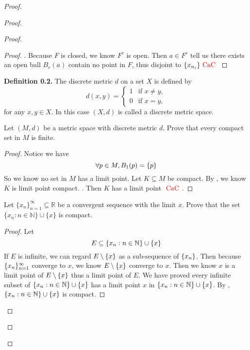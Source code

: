 \documentclass{report}
\begin{document}
\begin{proof}
\begin{proof}
\begin{proof}
\begin{proof}
. Because $F$ is closed, we know  $F^c$ is open. Then  $a\in F^c$ tell us there exists an open ball $B_r(a)$ contain no point in $F$, thus disjoint to  $\{ x_{n_i} \}\text{ \textcolor{red}{CaC} }$

\end{proof}
\textbf{Definition 0.2.} The discrete metric \( d \) on a set \( X \) is defined by
\[
d(x,y) = 
\begin{cases} 
1 & \text{if } x \neq y, \\
0 & \text{if } x = y,
\end{cases}
\]
for any \( x, y \in X \). In this case \( (X,d) \) is called a discrete metric space.
\begin{question}{}{}

Let \( (M, d) \) be a metric space with discrete metric \( d \). Prove that every compact set in \( M \) is finite.
\end{question}
\begin{proof}
Notice we have
\begin{equation}
\forall p\in M, B_1(p)=\{ p \}
\end{equation}
So we know no set in $M$ has a limit point. Let $K\subseteq M$ be compact. By , we know $K$ is limit point compact. . Then $K$ has a limit point  $\text{ \textcolor{red}{CaC} }$.
\end{proof}
\begin{question}{}{}

Let \( \{ x_n \}_{n=1}^{\infty} \subseteq \mathbb{R} \) be a convergent sequence with the limit \( x \). Prove that the set \( \{ x_n : n \in \mathbb{N} \} \cup \{ x \} \) is compact.
\end{question}
\begin{proof}
Let 
\begin{equation}
E\subseteq \{ x_n:n\in\mathbb{N} \}\cup \{ x \}
\end{equation}
If $E$ is infinite, we can regard  $E\setminus \{ x \}$ as a sub-sequence of $\{ x_n \}$. Then because $\{ x_n \}_{n=1}^\infty$ converge to $x$, we know  $E\setminus \{ x \}$ converge to $x$. Then we know $x$ is a limit point of $E\setminus \{ x \}$ thus a limit point of $E$. We have proved every infinite subset of $\{ x_n:n\in\mathbb{N} \}\cup \{ x \}$ has a limit point $x$ in $\{ x_n:n\in\mathbb{N} \}\cup \{ x \}$. By , $\{ x_n:n\in\mathbb{N} \}\cup \{ x \}$ is compact.
\end{proof}
\begin{question}{}{}


\end{question}
\end{proof}
\end{proof}
\end{proof}
\end{document}
